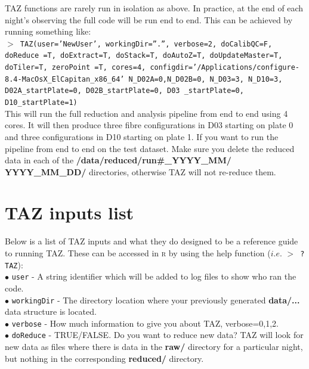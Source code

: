 \documentclass[12pt]{article}
\begin{document}
 TAZ functions are rarely run in isolation as above. In practice, at the end of each night's observing the full code will be run end to end. This can be achieved by running something like: \\
 
  \hspace{10mm} \texttt{$>$  TAZ(user='NewUser', workingDir=''.'', verbose=2,  doCalibQC=F, doReduce =T, doExtract=T, doStack=T,  doAutoZ=T,  doUpdateMaster=T, doTiler=T, zeroPoint =T, cores=4, configdir='/Applications/configure-8.4-MacOsX\_ElCapitan\_x86\_64' N\_D02A=0,N\_D02B=0, N\_D03=3, N\_D10=3, D02A\_startPlate=0, D02B\_startPlate=0, D03 \_startPlate=0, D10\_startPlate=1)}\\

This will run the full reduction and analysis pipeline from end to end using 4 cores. It will then produce three fibre configurations in D03 starting on plate 0 and three configurations in D10 starting on plate 1. If you want to run the pipeline from end to end on the test dataset. Make sure you delete the reduced data in each of the  \textbf{/data/reduced/run\#\_YYYY\_MM/ \\ YYYY\_MM\_DD/} directories, otherwise TAZ will not re-reduce them. 

\section{TAZ inputs list}

Below is a list of TAZ inputs and what they do designed to be a reference guide to running TAZ. These can be accessed in \textsc{r} by using the help function ($i.e.$ \texttt{$>$ ?TAZ}):\\


$\bullet$ \texttt{user} - A string identifier which will be added to log files to show who ran the code. \\

$\bullet$ \texttt{workingDir} - The directory location where your previously generated \textbf{data/...} data structure is located.\\

$\bullet$ \texttt{verbose} - How much information to give you about TAZ,  verbose=0,1,2.\\

$\bullet$ \texttt{doReduce} - TRUE/FALSE. Do you want to reduce new data? TAZ will look for new data as files where there is data in the \textbf{raw/} directory for a particular night, but nothing in the corresponding \textbf{reduced/} directory. 
\end{document}
